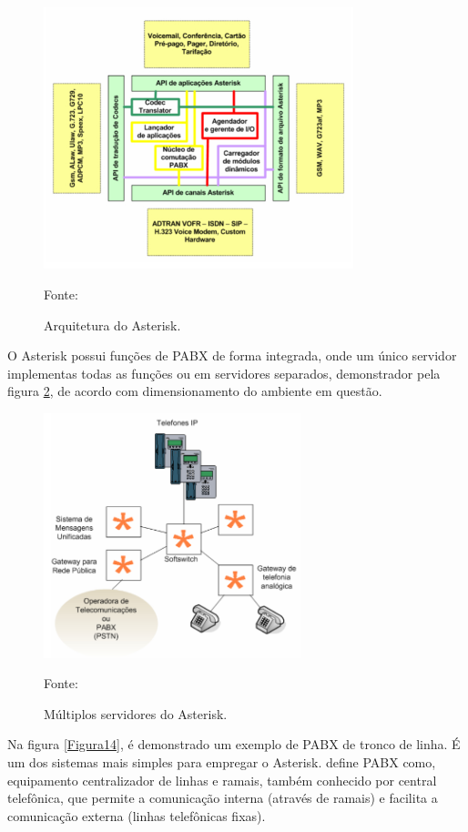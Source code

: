 \begin{figure}[h]
	\centering
	\includegraphics[width=9cm]{imagens/arquiteturaAsterisk.jpg}
	\caption{Arquitetura do Asterisk.}
    \label{Figura12}
    Fonte: \cite{flavioeduardoandredade2005}
\end{figure}

O Asterisk possui funções de PABX de forma integrada, onde um único servidor implementas todas as funções ou em servidores separados, demonstrador pela figura \ref{Figura13}, de acordo com dimensionamento do ambiente em questão. \cite{djaneelmajoanine2007}

\begin{figure}[h]
	\centering
	\includegraphics[width=7.5cm]{imagens/servidoresAsterisk.jpg}
	\caption{Múltiplos servidores do Asterisk.}
    \label{Figura13}
    Fonte: \cite{flavioeduardoandredade2005}
\end{figure}

Na figura \ref{Figura14}, é demonstrado um exemplo de PABX de tronco de linha. É um dos sistemas mais simples para empregar o Asterisk.  define PABX como, equipamento centralizador de linhas e ramais, também conhecido por central telefônica, que permite a comunicação interna (através de ramais) e facilita  a comunicação externa (linhas telefônicas fixas). 

